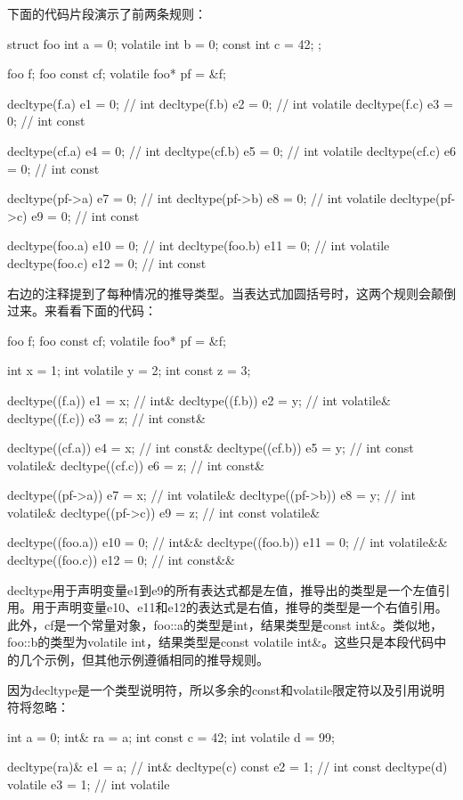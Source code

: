 下面的代码片段演示了前两条规则：

\begin{cpp}
struct foo
{
	int a = 0;
	volatile int b = 0;
	const int c = 42;
};

foo f;
foo const cf;
volatile foo* pf = &f;

decltype(f.a) e1 = 0; // int
decltype(f.b) e2 = 0; // int volatile
decltype(f.c) e3 = 0; // int const

decltype(cf.a) e4 = 0; // int
decltype(cf.b) e5 = 0; // int volatile
decltype(cf.c) e6 = 0; // int const

decltype(pf->a) e7 = 0; // int
decltype(pf->b) e8 = 0; // int volatile
decltype(pf->c) e9 = 0; // int const

decltype(foo{}.a) e10 = 0; // int
decltype(foo{}.b) e11 = 0; // int volatile
decltype(foo{}.c) e12 = 0; // int const
\end{cpp}

右边的注释提到了每种情况的推导类型。当表达式加圆括号时，这两个规则会颠倒过来。来看看下面的代码：

\begin{cpp}
foo f;
foo const cf;
volatile foo* pf = &f;

int x = 1;
int volatile y = 2;
int const z = 3;

decltype((f.a)) e1 = x; // int&
decltype((f.b)) e2 = y; // int volatile&
decltype((f.c)) e3 = z; // int const&

decltype((cf.a)) e4 = x; // int const&
decltype((cf.b)) e5 = y; // int const volatile&
decltype((cf.c)) e6 = z; // int const&

decltype((pf->a)) e7 = x; // int volatile&
decltype((pf->b)) e8 = y; // int volatile&
decltype((pf->c)) e9 = z; // int const volatile&

decltype((foo{}.a)) e10 = 0; // int&&
decltype((foo{}.b)) e11 = 0; // int volatile&&
decltype((foo{}.c)) e12 = 0; // int const&&
\end{cpp}

decltype用于声明变量e1到e9的所有表达式都是左值，推导出的类型是一个左值引用。用于声明变量e10、e11和e12的表达式是右值，推导的类型是一个右值引用。此外，cf是一个常量对象，foo::a的类型是int，结果类型是const int\&。类似地，foo::b的类型为volatile int，结果类型是const volatile int\&。这些只是本段代码中的几个示例，但其他示例遵循相同的推导规则。

因为decltype是一个类型说明符，所以多余的const和volatile限定符以及引用说明符将忽略：

\begin{cpp}
int a = 0;
int& ra = a;
int const c = 42;
int volatile d = 99;

decltype(ra)& e1 = a; // int&
decltype(c) const e2 = 1; // int const
decltype(d) volatile e3 = 1; // int volatile
\end{cpp}

